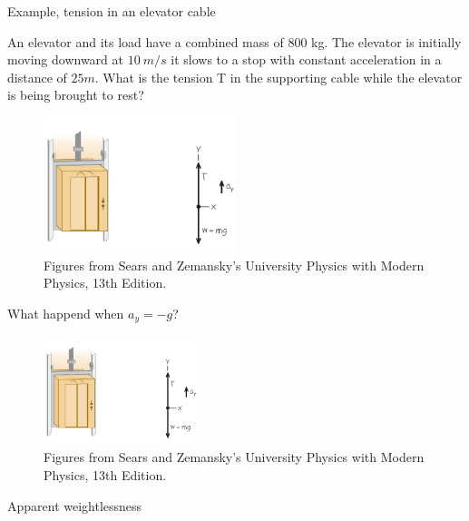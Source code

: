 \documentclass[]{beamer}
\begin{document}
    \begin{frame}
Example, tension in an elevator cable
\vspace{3mm}


An elevator and its load have a combined mass of 800 kg.
The elevator is initially moving downward at $10~m/s$ it slows to
a stop with constant acceleration in a distance of $25 m$. What is
the tension T in the supporting cable while the elevator is being
brought to rest?

\begin{figure}[h!]  
  \includegraphics[width=0.5\textwidth]{images/f17.jpg}
  \caption{ {\tiny Figures from Sears and Zemansky's University Physics 
  with Modern Physics, 13th Edition.} }
\end{figure}



      \end{frame}




    \begin{frame}
      
What happend when $a_y=-g$?
\vspace{3mm}



\begin{figure}[h!]  
  \includegraphics[width=0.4\textwidth]{images/f17.jpg}
  \caption{ {\tiny Figures from Sears and Zemansky's University Physics 
  with Modern Physics, 13th Edition.} }
\end{figure}

\pause
Apparent weightlessness


      \end{frame}
\end{document}

